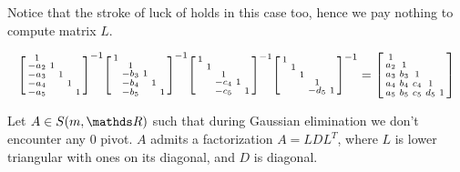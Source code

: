 \documentclass[ComputationalMathematics.tex]{subfiles}
\begin{document}
\begin{obs}
  Notice that the stroke of luck of  holds in this case too, hence we pay nothing to compute matrix $L$.
  
\begin{gather*}
\begin{bsmallmatrix}
    1 & \\
    -a_2 & 1 & \\
    -a_3 &  & 1  \\
    -a_4 &  & & 1  \\
    -a_5 &  &  & & 1 
\end{bsmallmatrix}^{-1}
\begin{bsmallmatrix}
    1 & \\
     & 1 & \\
     & -b_3 & 1  \\
     & -b_4 & & 1  \\
     & -b_5 &  & & 1 
\end{bsmallmatrix}^{-1}
\begin{bsmallmatrix}
    1 & \\
     & 1 & \\
     &  & 1  \\
     &  & -c_4& 1  \\
     &  & -c_5 & & 1 
\end{bsmallmatrix}^{-1} 
\begin{bsmallmatrix}
    1 & \\
     & 1 & \\
     &  & 1  \\
     &  & & 1  \\
     &  &  & -d_5& 1 
\end{bsmallmatrix}^{-1}
= \begin{bsmallmatrix}
    1 & \\
    a_2 & 1 & \\
    a_3 & b_3 & 1  \\
    a_4 & b_4 & c_4& 1  \\
    a_5 & b_5 & c_5 &d_5 & 1     
\end{bsmallmatrix}
\end{gather*}
\end{obs}

\begin{theorem}
Let $A \in S(m, \R)$ such that during Gaussian elimination we don't encounter any $0$ pivot. $A$ admits a factorization $A=LDL^T$, where $L$ is lower triangular with ones on its diagonal, and $D$ is diagonal.
\end{theorem}
\end{document}
